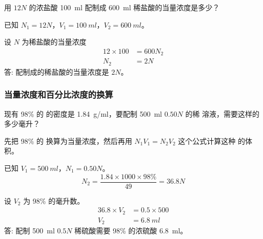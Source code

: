\begin{example}
  用 $12N$ 的浓盐酸 \qty{100}{ml} 配制成 \qty{600}{ml} 稀盐酸的当量浓度是多少？
\end{example}
\begin{solution}
  已知 $N_1=12N$，$V_1=\qty{100}{ml}$，$V_2=\qty{600}{ml}$。

  设 $N$ 为稀盐酸的当量浓度
  \begin{align*} 
    12\times100&=600N_2\\ 
    N_2&=2N
  \end{align*}
  答: 配制成的稀盐酸的当量浓度是 $2N$。
\end{solution}

\subsubsection{当量浓度和百分比浓度的换算}
\begin{example}
  现有 98\% 的  的密度是 \qty{1.84}{g/ml}，要配制 \qty{500}{ml} $0.50N$ 的稀  溶液，需要这样的  多少毫升？
\end{example}

\begin{analyze}
  先把 98\% 的  换算为当量浓度，然后再用 $N_1V_1=N_2V_2$ 这个公式计算这种  的体积。
\end{analyze}

\begin{solution}
  已知 $V_1=\qty{500}{ml}$，$N_1=0.50N$。
  \[ N_2=\frac{1.84\times1000\times 98\%}{49}=36.8 N\]

  设 $V_2$ 为 98\%  的毫升数。
  \begin{align*} 
    36.8\times V_2&=0.5\times 500\\ 
    V_2&=\qty{6.8}{ml}
  \end{align*}
  答: 配制 \qty{500}{ml} $0.5N$ 稀硫酸需要 98\% 的浓硫酸 \qty{6.8}{ml}。
\end{solution}

